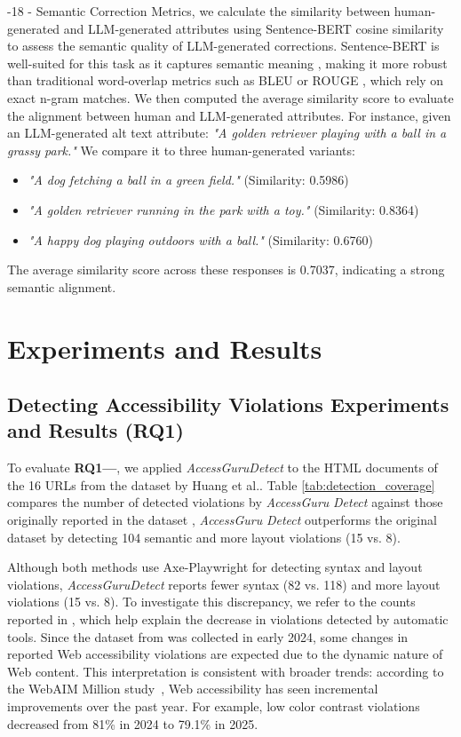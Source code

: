 \documentclass[sigconf, nonacm]{acmart}
\makeatletter
\newcommand{\method}{\emph{AccessGuru}}
\renewcommand\subsubsection{\@startsection{subsubsection}{3}{\z@}%
  {-18\p@ \@plus -4\p@ \@minus -4\p@}%
  {-\p@}%
  {\normalfont\normalsize\itshape}%
}
\makeatother
\begin{document}
\subsubsection{Semantic Correction Metrics, } we calculate the similarity between human-generated and LLM-generated attributes using Sentence-BERT cosine similarity to assess the semantic quality of LLM-generated corrections. Sentence-BERT is well-suited for this task as it captures semantic meaning \cite{reimers2019sentence}, making it more robust than traditional word-overlap metrics such as BLEU \cite{post2018call} or ROUGE \cite{lin2004rouge}, which rely on exact n-gram matches. We then computed the average similarity score to evaluate the alignment between human and LLM-generated attributes. For instance, given an LLM-generated alt text attribute:
\textit{"A golden retriever playing with a ball in a grassy park."} We compare it to three human-generated variants:
\begin{itemize}
    \item \textit{"A dog fetching a ball in a green field."} (Similarity: 0.5986)
\item \textit{"A golden retriever running in the park with a toy."} (Similarity: 0.8364)
\item \textit{"A happy dog playing outdoors with a ball." }(Similarity: 0.6760)
\end{itemize}
The average similarity score across these responses is 0.7037, indicating a strong semantic alignment. 
\section{Experiments and Results}
\subsection{Detecting Accessibility Violations Experiments and Results (RQ1) }
To evaluate \textbf{RQ1—}, we applied \method \emph{Detect} to the HTML documents of the 16 URLs from the dataset by Huang et al.\cite{DBLP:journals/corr/abs-2401-16450}. Table \ref{tab:detection_coverage} compares the number of detected violations by \method{} \emph{Detect} against those originally reported in the dataset \cite{DBLP:journals/corr/abs-2401-16450},  \method{} \emph{Detect} outperforms the original dataset by detecting 104 semantic and more layout violations (15 vs. 8).

Although both methods use Axe-Playwright for detecting syntax and layout violations, \method{}\emph{Detect} reports fewer syntax (82 vs. 118) and more layout violations (15 vs. 8). To investigate this discrepancy, we refer to the counts reported in \cite{DBLP:journals/corr/abs-2401-16450}, which help explain the decrease in violations detected by automatic tools. Since the dataset from \cite{DBLP:journals/corr/abs-2401-16450} was collected in early 2024, some changes in reported Web accessibility violations are expected due to the dynamic nature of Web content. This interpretation is consistent with broader trends: according to the WebAIM Million study~\cite{Webaim2025}, Web accessibility has seen incremental improvements over the past year. For example, low color contrast violations decreased from 81\% in 2024 to 79.1\% in 2025.
\end{document}
